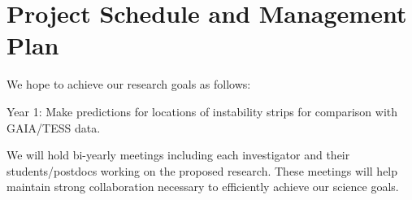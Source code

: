 \section{Project Schedule and Management Plan}

We hope to achieve our research goals as follows:

Year 1: Make predictions for locations of instability strips for comparison with GAIA/TESS data. 

We will  hold bi-yearly meetings including each investigator and their students/postdocs working on the proposed research. These meetings will help maintain strong collaboration necessary to efficiently achieve our science goals.
